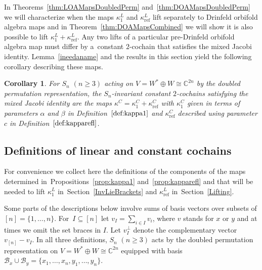 \documentclass[pdftex]{sigma}
\numberwithin{equation}{section}
\newtheorem{Corollary}[Theorem]{Corollary}
\DeclareMathOperator{\refl}{ref}
\begin{document}
In Theorems~\ref{thm:LOAMapsDoubledPerm} and~\ref{thm:DOAMapsDoubledPerm}
we will characterize when the maps $\kappa^L_1$ and $\kappa^L_{\refl}$ lift separately
to Drinfeld orbifold algebra maps and in Theorem~\ref{thm:DOAMapsCombined} we will
show it is also possible to lift $\kappa^L_1+\kappa^L_{\refl}$. Any two lifts
of a particular pre-Drinfeld orbifold algebra map must differ by a~con\-stant
$2$-cochain that satisfies the mixed Jacobi identity. Lemma~\ref{ineedaname} and the results in this section yield the
following corollary describing these maps.

\begin{Corollary}\label{mixedJacobi}
For $S_n$ $(n\geq 3)$ acting on $V=W^* \oplus W \cong \mathbb{C}^{2n}$ by the
doubled permutation representation, the
$S_n$-invariant constant $2$-cochains satisfying the mixed Jacobi identity
are the maps $\kappa^C=\kappa^C_1+\kappa^C_{\refl}$ with $\kappa^C_1$ given in
terms of parameters $\alpha$ and $\beta$ in Definition~$\ref{def:kappa1}$
and $\kappa^C_{\refl}$ described using parameter $c$ in Definition~$\ref{def:kapparefl}$.
\end{Corollary}

\subsection{Definitions of linear and constant cochains}
For convenience we collect here the definitions of the components of the maps
determined in~Pro\-positions~\ref{prop:kappa1} and~\ref{prop:kapparefl} and that
will be needed to lift $\kappa^L_1$ in~Section~\ref{InvLieBrackets} and
$\kappa^L_{\refl}$ in~Section~\ref{Lifting}.

Some parts of the descriptions below involve sums of basis vectors
over subsets of $[n]=\{1,\dots,n\}$. For~$I \subseteq [n]$ let $v_I=\sum_{i \in I} v_i$,
where $v$ stands for $x$ or $y$ and at times we omit the set braces in $I$.
Let $v_I^\perp$ denote the complementary vector $v_{[n]}-v_I$.
In all three definitions, $S_n$ $(n \geq 3)$ acts by the doubled permutation representation on $V=W^* \oplus W \cong \mathbb{C}^{2n}$ equipped with basis $\mathcal{B}_x \cup \mathcal{B}_y=\{x_1,\dots,x_n,y_1,\dots,y_n\}$.
\end{document}
